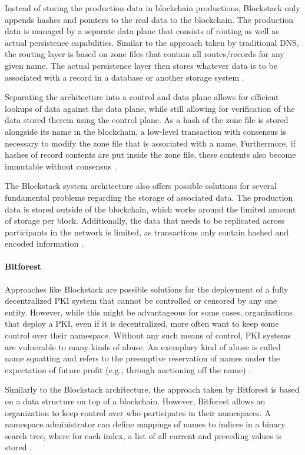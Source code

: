 Instead of storing the production data in blockchain productions, Blockstack only appends hashes and pointers to the real data to the blockchain. The production data is managed by a separate data plane that consists of routing as well as actual persistence capabilities. Similar to the approach taken by traditional DNS, the routing layer is based on zone files that contain all routes/records for any given name. The actual persistence layer then stores whatever data is to be associated with a record in a database or another storage system \cite{ali_blockstack:_2016}.

Separating the architecture into a control and data plane allows for efficient lookups of data against the data plane, while still allowing for verification of the data stored therein using the control plane. As a hash of the zone file is stored alongside its name in the blockchain, a low-level transaction with consensus is necessary to modify the zone file that is associated with a name. Furthermore, if hashes of record contents are put inside the zone file, these contents also become immutable without consensus \cite{ali_blockstack:_2016}.

The Blockstack system architecture also offers possible solutions for several fundamental problems regarding the storage of associated data. The production data is stored outside of the blockchain, which works around the limited amount of storage per block. Additionally, the data that needs to be replicated across participants in the network is limited, as transactions only contain hashed and encoded information \cite{ali_blockstack:_2016}.

\paragraph{Bitforest}

Approaches like Blockstack are possible solutions for the deployment of a fully decentralized PKI system that cannot be controlled or censored by any one entity. However, while this might be advantageous for some cases, organizations that deploy a PKI, even if it is decentralized, more often want to keep some control over their namespace. Without any such means of control, PKI systems are vulnerable to many kinds of abuse. An exemplary kind of abuse is called name squatting and refers to the preemptive reservation of names under the expectation of future profit (e.g., through auctioning off the name) \cite{dong_bitforest:_2018}.

Similarly to the Blockstack architecture, the approach taken by Bitforest is based on a data structure on top of a blockchain. However, Bitforest allows an organization to keep control over who participates in their namespaces. A namespace administrator can define mappings of names to indices in a binary search tree, where for each index, a list of all current and preceding values is stored \cite{dong_bitforest:_2018}.

